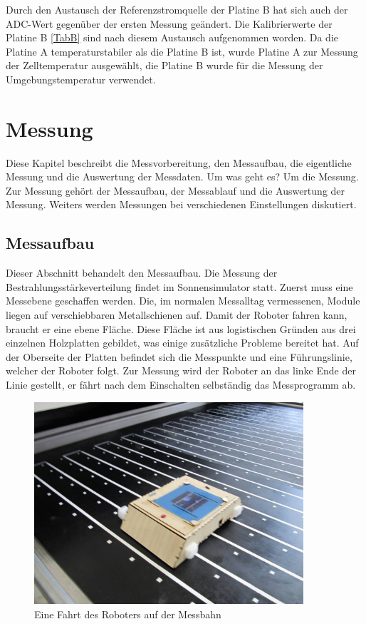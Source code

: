 \documentclass[a4paper,bibtotoc,oneside]{scrbook}
\begin{document}
Durch den Austausch der Referenzstromquelle der Platine B hat sich auch der ADC-Wert gegenüber der ersten Messung geändert. Die Kalibrierwerte der Platine B \ref{TabB} sind nach diesem Austausch aufgenommen worden.
Da die Platine A temperaturstabiler als die Platine B ist, wurde Platine A zur Messung der Zelltemperatur ausgewählt, die Platine B wurde für die Messung der Umgebungstemperatur verwendet. 

\chapter{Messung}\thispagestyle{empty}

Diese Kapitel beschreibt die Messvorbereitung, den Messaufbau, die eigentliche Messung und die Auswertung der Messdaten. Um was geht es? Um die Messung. Zur Messung gehört der Messaufbau, der Messablauf und die Auswertung der Messung. Weiters werden Messungen bei verschiedenen Einstellungen diskutiert. 

\section{Messaufbau}\thispagestyle{empty}
Dieser Abschnitt behandelt den Messaufbau. Die Messung der Bestrahlungsstärkeverteilung findet im Sonnensimulator statt. Zuerst muss eine Messebene geschaffen werden. Die, im normalen Messalltag vermessenen, Module liegen auf verschiebbaren Metallschienen auf. Damit der Roboter fahren kann, braucht er eine ebene Fläche. Diese Fläche ist aus logistischen Gründen aus drei einzelnen Holzplatten gebildet, was einige zusätzliche Probleme bereitet hat. Auf der Oberseite der Platten befindet sich die Messpunkte und eine Führungslinie, welcher der Roboter folgt. Zur Messung wird der Roboter an das linke Ende der Linie gestellt, er fährt nach dem Einschalten selbständig das Messprogramm ab.

\begin{figure}[htbp]
\centering
\includegraphics[width=100mm]{img/robofahrt.jpg}
\caption{Eine Fahrt des Roboters auf der Messbahn}\label{robofahrt}
\end{figure}
\end{document}

